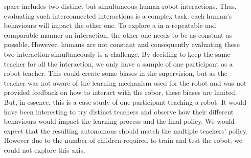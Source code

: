 \gls{sparc} includes two distinct but simultaneous human-robot interactions. Thus, evaluating such interconnected interactions is a complex task: each human's behaviours will impact the other one. To explore a in a repeatable and comparable manner an interaction, the other one needs to be as constant as possible. However, humans are not constant and consequently evaluating these two interaction simultaneously is a challenge. By deciding to keep the same teacher for all the interaction, we only have a sample of one participant as a robot teacher. This could create some biases in the supervision, but as the teacher was not aware of the learning mechanism used for the robot and was not provided feedback on how to interact with the robor, these biases are limited. But, in essence, this is a case study of one participant teaching a robot. It would have been interesting to try distinct teachers and observe how their different behaviours would impact the learning process and the final policy. We would expect that the resulting autonomous should match the multiple teachers' policy. However due to the number of children required to train and test the robot, we could not explore this axis. 
%



